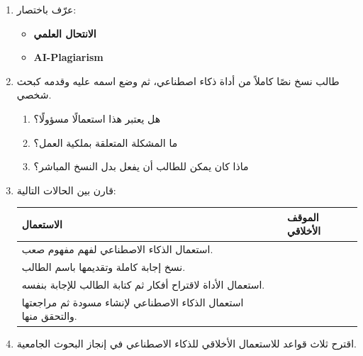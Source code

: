\documentclass[a4paper]{article}
\begin{document}
\begin{enumerate}

\item عرّف باختصار:

\begin{itemize}

    \item \textbf{الانتحال العلمي}


    \item \textbf{\textenglish{AI-Plagiarism}}
   
\end{itemize}


\item طالب نسخ نصًا كاملاً من أداة ذكاء اصطناعي،
ثم وضع اسمه عليه وقدمه كبحث شخصي.

\begin{enumerate}

    \item هل يعتبر هذا استعمالًا مسؤولًا؟
    
    \item ما المشكلة المتعلقة بملكية العمل؟
    
    \item ماذا كان يمكن للطالب أن يفعل بدل النسخ المباشر؟

\end{enumerate}


\item قارن بين الحالات التالية:

\begin{center}

\begin{tabular}{|
>{\raggedleft\arraybackslash}m{7cm}|
>{\raggedleft\arraybackslash}m{7cm}|}

\hline

\textbf{الاستعمال} & \textbf{الموقف الأخلاقي} \\

\hline

استعمال الذكاء الاصطناعي لفهم مفهوم صعب.
&
\\[0.45cm]
\hline

نسخ إجابة كاملة وتقديمها باسم الطالب.
&
\\[0.45cm]
\hline

استعمال الأداة لاقتراح أفكار ثم كتابة الطالب
للإجابة بنفسه.
&
\\[0.45cm]
\hline

استعمال الذكاء الاصطناعي لإنشاء مسودة ثم مراجعتها
والتحقق منها.
&
\\[0.45cm]
\hline

\end{tabular}

\end{center}


\item اقترح ثلاث قواعد للاستعمال الأخلاقي للذكاء الاصطناعي
في إنجاز البحوث الجامعية.

\end{enumerate}
\end{document}
